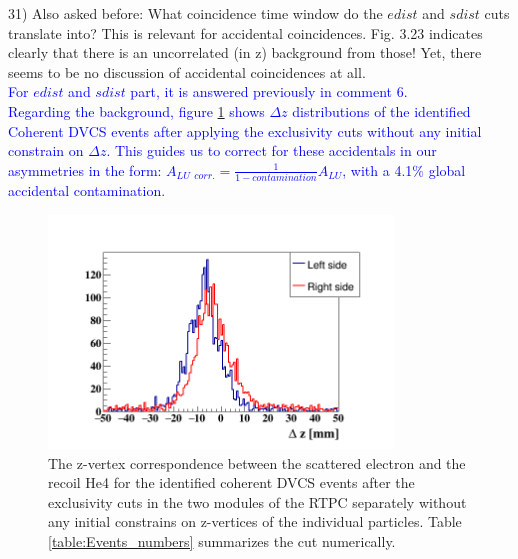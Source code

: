 31) Also asked before: What coincidence time window do the $edist$ and $sdist$ 
cuts translate into? This is relevant for accidental coincidences. Fig. 3.23 
indicates clearly that there is an uncorrelated (in z) background from those!  
Yet, there seems to be no discussion of accidental coincidences at all.\\
\textcolor{blue}{For $edist$ and $sdist$ part, it is answered previously in 
comment 6.}\\

\textcolor{blue}{ Regarding the background, figure 
\ref{fig:delta_z_after_exclusitivty} shows $\Delta z$ distributions of the 
identified Coherent DVCS events after applying the exclusivity cuts without any 
initial constrain on $\Delta z$.  This guides us to correct for these 
accidentals in our asymmetries in the form: $ A_{LU~~corr.} = \frac{1}{1 - 
contamination} A_{LU}$, with a 4.1$\%$ global accidental contamination.} \\

\begin{figure}[tbp]
\centering
\includegraphics[height=6.2cm]{fig/rtpc_delta_z.png}
\caption{The z-vertex correspondence between the scattered electron and the 
recoil He4 for the identified coherent DVCS events after the exclusivity cuts 
in the two modules of the RTPC separately without any initial constrains on 
z-vertices of the individual particles.  Table \ref{table:Events_numbers} 
summarizes the cut numerically.}

\label{fig:delta_z_after_exclusitivty}
 \end{figure}


